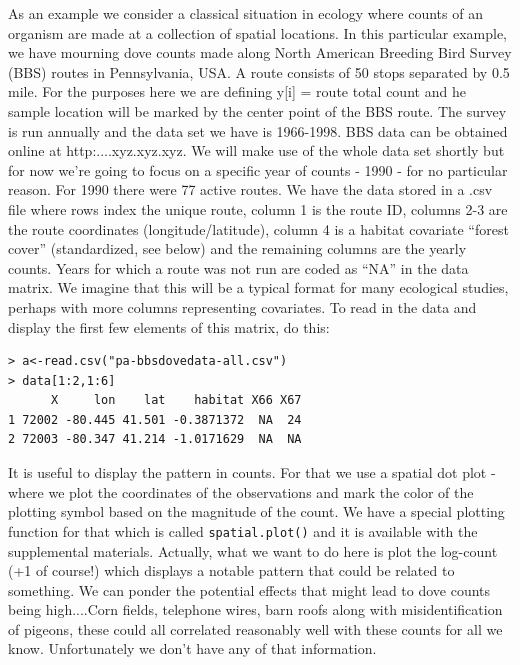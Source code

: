 As an example we consider a classical situation in ecology where counts of an organism are made at a collection of spatial locations. In this particular example, we have mourning dove counts made along North American Breeding Bird Survey (BBS) routes in Pennsylvania, USA. A route consists of 50 stops separated by 0.5 mile. For the purposes here we are defining y[i] = route total count and he sample location will be marked by the center point of the BBS route.  The survey is run annually and the data set we have is 1966-1998. BBS data can be obtained online at http:....xyz.xyz.xyz.  We will make use of the whole data set shortly but for now we're going to focus on a specific year of counts - 1990 - for no particular reason. For 1990 there were 77 active routes. We have the data stored in a .csv file where rows index the unique route, column 1 is the route ID, columns 2-3 are the route coordinates (longitude/latitude), column 4 is a habitat covariate ``forest cover'' (standardized, see below) and the remaining columns are the yearly counts. Years for which a route was not run are coded as ``NA'' in the data matrix. We imagine that this will be a typical format for many ecological studies, perhaps with more columns representing covariates.  To read in the data and display the first few elements of this matrix, do this:

\begin{verbatim}
> a<-read.csv("pa-bbsdovedata-all.csv")
> data[1:2,1:6]
      X     lon    lat    habitat X66 X67
1 72002 -80.445 41.501 -0.3871372  NA  24
2 72003 -80.347 41.214 -1.0171629  NA  NA
\end{verbatim}

It is useful to display the pattern in counts. For that we use a spatial dot plot - where we plot the coordinates of the observations and mark the color of the plotting symbol based on the magnitude of the count.  We have a special plotting function for that which is called \mbox{\tt spatial.plot()} and it is available with the supplemental materials. Actually, what we want to do here is plot the log-count (+1 of course!) which displays a notable pattern that could be related to something. We can ponder the potential effects that might lead to dove counts being high....Corn fields, telephone wires, barn roofs along with misidentification of pigeons, these could all correlated reasonably well with these counts for all we know. Unfortunately we don't have any of that information. 

